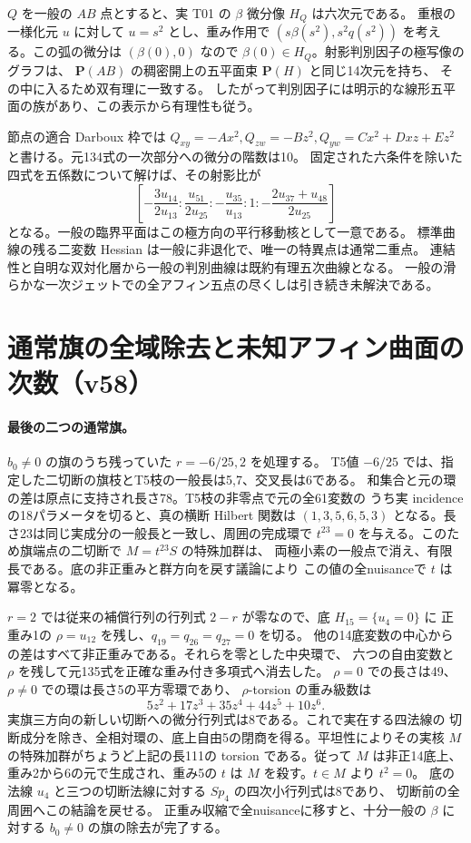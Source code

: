 \documentclass[11pt,a4paper]{ltjsarticle}
\theoremstyle{remark}
\begin{document}
$Q$ を一般の $AB$ 点とすると、実 T01 の $\beta$ 微分像 $H_Q$ は六次元である。
重根の一様化元 $u$ に対して $u=s^2$ とし、重み作用で
$(s\beta(s^2),s^2q(s^2))$ を考える。この弧の微分は $(\beta(0),0)$ なので
$\beta(0)\in H_Q$。射影判別因子の極写像のグラフは、
$\mathbf P(AB)$ の稠密開上の五平面束 $\mathbf P(H)$ と同じ14次元を持ち、
その中に入るため双有理に一致する\cite{linear-ruling-v57}。
したがって判別因子には明示的な線形五平面の族があり、この表示から有理性も従う。

節点の適合 Darboux 枠では $Q_{xy}=-Ax^2,Q_{zw}=-Bz^2,
Q_{yw}=Cx^2+Dxz+Ez^2$ と書ける。元134式の一次部分への微分の階数は10。
固定された六条件を除いた四式を五係数について解けば、その射影比が
\[
\left[-\frac{3u_{14}}{2u_{13}}:\frac{u_{51}}{2u_{25}}:
-\frac{u_{35}}{u_{13}}:1:-\frac{2u_{37}+u_{48}}{2u_{25}}\right]
\]
となる。一般の臨界平面はこの極方向の平行移動核として一意である。
標準曲線の残る二変数 Hessian は一般に非退化で、唯一の特異点は通常二重点。
連結性と自明な双対化層から一般の判別曲線は既約有理五次曲線となる。
一般の滑らかな一次ジェットでの全アフィン五点の尽くしは引き続き未解決である。

\section{通常旗の全域除去と未知アフィン曲面の次数（v58）}
\paragraph{最後の二つの通常旗。}
$b_0\ne0$ の旗のうち残っていた $r=-6/25,2$ を処理する。
T5値 $-6/25$ では、指定した二切断の旗枝とT5枝の一般長は5,7、交叉長は6である。
和集合と元の環の差は原点に支持され長さ78。T5枝の非零点で元の全61変数の
うち実 incidence の18パラメータを切ると、真の横断 Hilbert 関数は
$(1,3,5,6,5,3)$ となる。長さ23は同じ実成分の一般長と一致し、周囲の完成環で
$t^{23}=0$ を与える。このため旗端点の二切断で $M=t^{23}S$ の特殊加群は、
両極小素の一般点で消え、有限長である。底の非正重みと群方向を戻す議論により
この値の全nuisanceで $t$ は冪零となる\cite{t5-v58,t5-review-v58}。

$r=2$ では従来の補償行列の行列式 $2-r$ が零なので、底 $H_{15}=\{u_4=0\}$ に
正重み1の $\rho=u_{12}$ を残し、$q_{19}=q_{26}=q_{27}=0$ を切る。
他の14底変数の中心からの差はすべて非正重みである。それらを零とした中央環で、
六つの自由変数と $\rho$ を残して元135式を正確な重み付き多項式へ消去した。
$\rho=0$ での長さは49、$\rho\ne0$ での環は長さ5の平方零環であり、
$\rho$-torsion の重み級数は
\[
5z^2+17z^3+35z^4+44z^5+10z^6.
\]
実旗三方向の新しい切断への微分行列式は8である。これで実在する四法線の
切断成分を除き、全相対環の、底上自由5の閉商を得る。平坦性によりその実核
$M$ の特殊加群がちょうど上記の長111の torsion である。従って $M$ は非正14底上、
重み2から6の元で生成され、重み5の $t$ は $M$ を殺す。$t\in M$ より $t^2=0$。
底の法線 $u_4$ と三つの切断法線に対する $Sp_4$ の四次小行列式は8であり、
切断前の全周囲へこの結論を戻せる\cite{r2-v58,r2-review-v58}。
正重み収縮で全nuisanceに移すと、十分一般の $\beta$ に対する
$b_0\ne0$ の旗の除去が完了する。
\end{document}
